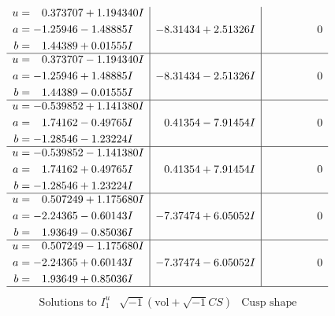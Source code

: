 \documentclass[1p]{elsarticle_modified}
\theoremstyle{definition}
\newcommand{\I}{\sqrt{-1}}
\begin{document}
$$\begin{array}{c|c|c}
\begin{aligned}
u &= \phantom{-}0.373707 + 1.194340 I \\
a &= -1.25946 - 1.48885 I \\
b &= \phantom{-}1.44389 + 0.01555 I\end{aligned}
 & -8.31434 + 2.51326 I & \phantom{-0.000000 } 0 \\ \hline\begin{aligned}
u &= \phantom{-}0.373707 - 1.194340 I \\
a &= -1.25946 + 1.48885 I \\
b &= \phantom{-}1.44389 - 0.01555 I\end{aligned}
 & -8.31434 - 2.51326 I & \phantom{-0.000000 } 0 \\ \hline\begin{aligned}
u &= -0.539852 + 1.141380 I \\
a &= \phantom{-}1.74162 - 0.49765 I \\
b &= -1.28546 - 1.23224 I\end{aligned}
 & \phantom{-}0.41354 - 7.91454 I & \phantom{-0.000000 } 0 \\ \hline\begin{aligned}
u &= -0.539852 - 1.141380 I \\
a &= \phantom{-}1.74162 + 0.49765 I \\
b &= -1.28546 + 1.23224 I\end{aligned}
 & \phantom{-}0.41354 + 7.91454 I & \phantom{-0.000000 } 0 \\ \hline\begin{aligned}
u &= \phantom{-}0.507249 + 1.175680 I \\
a &= -2.24365 - 0.60143 I \\
b &= \phantom{-}1.93649 - 0.85036 I\end{aligned}
 & -7.37474 + 6.05052 I & \phantom{-0.000000 } 0 \\ \hline\begin{aligned}
u &= \phantom{-}0.507249 - 1.175680 I \\
a &= -2.24365 + 0.60143 I \\
b &= \phantom{-}1.93649 + 0.85036 I\end{aligned}
 & -7.37474 - 6.05052 I & \phantom{-0.000000 } 0\\
 \hline 
 \end{array}$$\newpage$$\begin{array}{c|c|c}  
\text{Solutions to }I^u_{1}& \I (\text{vol} + \sqrt{-1}CS) & \text{Cusp shape}\\
 \hline 
\begin{aligned}

\end{aligned}
\end{array}$$
\end{document}

